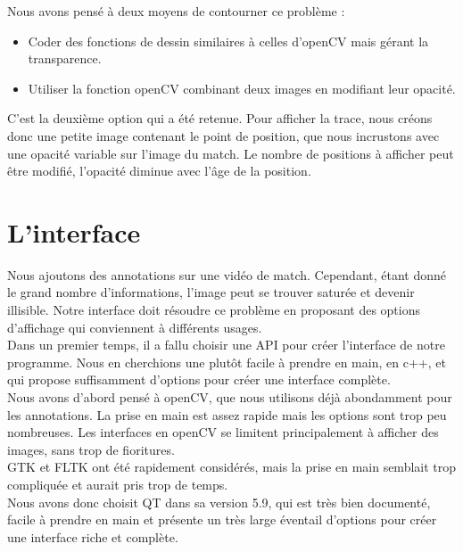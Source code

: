 \documentclass[a4paper,12pt]{report}
\begin{document}
Nous avons pensé à deux moyens de contourner ce problème : 
\begin{itemize}
    \item Coder des fonctions de dessin similaires à celles d'openCV mais gérant la transparence.
    \item Utiliser la fonction openCV combinant deux images en modifiant leur opacité.
\end{itemize}
\vspace{10pt}

C'est la deuxième option qui a été retenue. Pour afficher la trace, nous créons donc une petite image contenant le point de position, que nous incrustons avec une opacité variable sur l'image du match. Le nombre de positions à afficher peut être modifié, l'opacité diminue avec l'âge de la position. 




\section{L'interface}
Nous ajoutons des annotations sur une vidéo de match. Cependant, étant donné le grand nombre d'informations, l'image peut se trouver saturée et devenir illisible. Notre interface doit résoudre ce problème en proposant des options d'affichage qui conviennent à différents usages.
\\


Dans un premier temps, il a fallu choisir une API pour créer l'interface de notre programme. Nous en cherchions une plutôt facile à prendre en main, en c++, et qui propose suffisamment d'options pour créer une interface complète. 
\\

Nous avons d'abord pensé à openCV, que nous utilisons déjà abondamment pour les annotations. La prise en main est assez rapide mais les options sont trop peu nombreuses. Les interfaces en openCV se limitent principalement à afficher des images, sans trop de fioritures. 
\\

GTK et FLTK ont été rapidement considérés, mais la prise en main semblait trop compliquée et aurait pris trop de temps. 
\\

Nous avons donc choisit QT dans sa version 5.9, qui est très bien documenté, facile à prendre en main et présente un très large éventail d'options pour créer une interface riche et complète.
\\
\end{document}

